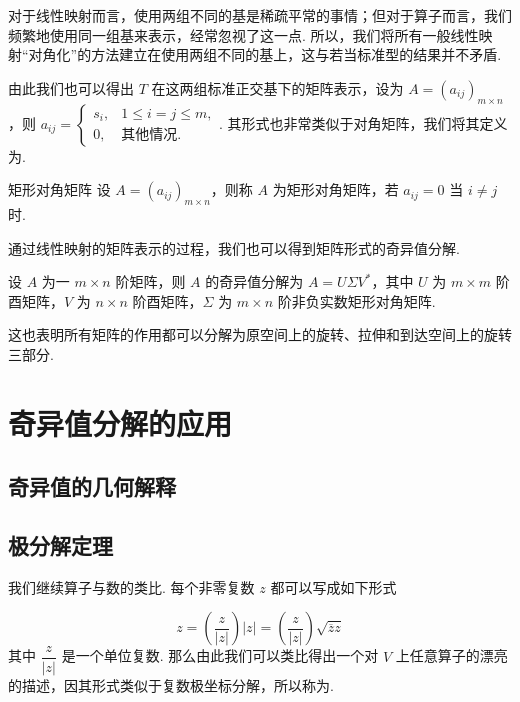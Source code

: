 对于线性映射而言，使用两组不同的基是稀疏平常的事情；但对于算子而言，我们频繁地使用同一组基来表示，经常忽视了这一点. 所以，我们将所有一般线性映射“对角化”的方法建立在使用两组不同的基上，这与若当标准型的结果并不矛盾.

由此我们也可以得出 $ T $ 在这两组标准正交基下的矩阵表示，设为 $ A = (a_{ij})_{m \times n} $，则 $ a_{ij} = \begin{cases}
        s_i, & 1 \leqslant i = j \leqslant m, \\
        0,   & \text{其他情况}.
    \end{cases} $. 其形式也非常类似于对角矩阵，我们将其定义为.

\begin{definition}{矩形对角矩阵}{} 
    设 $ A = (a_{ij})_{m \times n} $，则称 $ A $ 为矩形对角矩阵，若 $ a_{ij} = 0 $ 当 $ i \neq j $ 时.
\end{definition}

通过线性映射的矩阵表示的过程，我们也可以得到矩阵形式的奇异值分解.

\begin{theorem}{}{}
    设 $ A $ 为一 $ m \times n $ 阶矩阵，则 $ A $ 的奇异值分解为 $ A = U\Sigma V^* $，其中 $ U $ 为 $ m \times m $ 阶酉矩阵，$ V $ 为 $ n \times n $ 阶酉矩阵，$ \Sigma $ 为 $ m \times n $ 阶非负实数矩形对角矩阵.
\end{theorem}

这也表明所有矩阵的作用都可以分解为原空间上的旋转、拉伸和到达空间上的旋转三部分.

\section{奇异值分解的应用}

\subsection{奇异值的几何解释}

\subsection{极分解定理}

我们继续算子与数的类比. 每个非零复数 $ z $ 都可以写成如下形式

\[ z = \left(\dfrac{z}{\lvert z \rvert}\right)\lvert z \rvert = \left(\dfrac{z}{\lvert z \rvert}\right)\sqrt{\overline{z}z} \]
其中 $ \dfrac{z}{\lvert z \rvert} $ 是一个单位复数. 那么由此我们可以类比得出一个对 $ V $ 上任意算子的漂亮的描述，因其形式类似于复数极坐标分解，所以称为.

